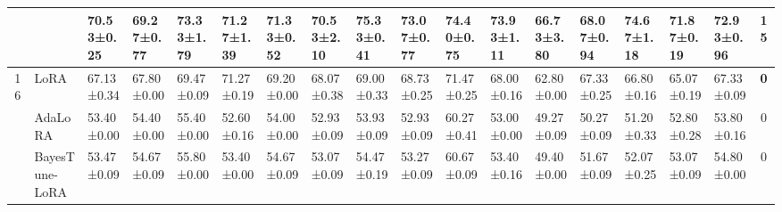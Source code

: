\begin{table*}[]
\begin{scriptsize}
{\begin{tabular}{c|l|l|l|l|l|l|l|l|l|l|l|l|l|l|l|l|c}
                    & \method{}                                 & \textbf{70.53±0.25}              & \textbf{69.27±0.77}              & \textbf{73.33±1.79}              & \textbf{71.27±1.39}              & \textbf{71.33±0.52}              & \textbf{70.53±2.10}               & \textbf{75.33±0.41}              & \textbf{73.07±0.77}              & \textbf{74.40±0.75}               & \textbf{73.93±1.11}              & \textbf{66.73±3.80}               & \textbf{68.07±0.94}              & \textbf{74.67±1.18}              & \textbf{71.87±0.19}              & \textbf{72.93±0.96}              & \textbf{15}   \\ \hline
\multirow{5}{*}{16} & LoRA                                   & 67.13±0.34                       & 67.80±0.00                        & 69.47±0.09                       & 71.27±0.19                       & 69.20±0.00                        & 68.07±0.38                       & 69.00±0.33                        & 68.73±0.25                       & 71.47±0.25                       & 68.00±0.16                        & 62.80±0.00                        & 67.33±0.25                       & 66.80±0.16                        & 65.07±0.19                       & 67.33±0.09                       & \textbf{0}    \\ %
                    & AdaLoRA                              & 53.40±0.00                        & 54.40±0.00                        & 55.40±0.00                        & 52.60±0.16                        & 54.00±0.00                        & 52.93±0.09                       & 53.93±0.09                       & 52.93±0.09                       & 60.27±0.41                       & 53.00±0.00                        & 49.27±0.09                       & 50.27±0.09                       & 51.20±0.33                        & 52.80±0.28                        & 53.80±0.16                        & 0             \\ %
                    & BayesTune-LoRA                            & 53.47±0.09                       & 54.67±0.09                       & 55.80±0.00                        & 53.40±0.00                        & 54.67±0.09                       & 53.07±0.09                       & 54.47±0.19                       & 53.27±0.09                       & 60.67±0.09                       & 53.40±0.16                        & 49.40±0.00                        & 51.67±0.09                       & 52.07±0.25                       & 53.07±0.09                       & 54.80±0.00                        & 0             \\ %

\end{tabular}}
\end{scriptsize}
\end{table*}
